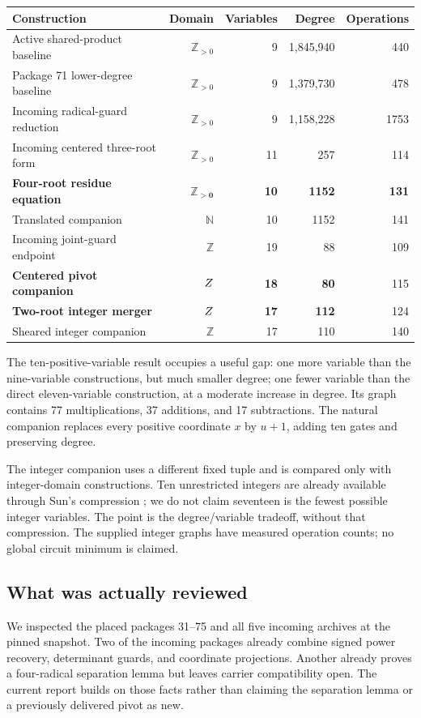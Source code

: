 \documentclass[11pt]{article}
\theoremstyle{remark}
\newcommand{\Z}{\mathbb Z}
\newcommand{\N}{\mathbb N}
\newcommand{\Zp}{\mathbb Z_{>0}}
\begin{document}
\begin{center}
\small
\begin{tabular}{@{}lrrrr@{}}
\toprule
Construction & Domain & Variables & Degree & Operations\\
\midrule
Active shared-product baseline & $\Zp$ & 9 & 1,845,940 & 440\\
Package 71 lower-degree baseline & $\Zp$ & 9 & 1,379,730 & 478\\
Incoming radical-guard reduction & $\Zp$ & 9 & 1,158,228 & 1753\\
Incoming centered three-root form & $\Zp$ & 11 & 257 & 114\\
\textbf{Four-root residue equation} & $\mathbf{\Zp}$ & \textbf{10} & \textbf{1152} & \textbf{131}\\
Translated companion & $\N$ & 10 & 1152 & 141\\
\midrule
Incoming joint-guard endpoint & $\Z$ & 19 & 88 & 109\\
\textbf{Centered pivot companion} & $\mathbf\Z$ & \textbf{18} & \textbf{80} & 115\\
\textbf{Two-root integer merger} & $\mathbf\Z$ & \textbf{17} & \textbf{112} & 124\\
Sheared integer companion & $\Z$ & 17 & 110 & 140\\
\bottomrule
\end{tabular}
\end{center}
The ten-positive-variable result occupies a useful gap: one more variable
than the nine-variable constructions, but much smaller degree; one fewer
variable than the direct eleven-variable construction, at a moderate
increase in degree. Its graph contains 77 multiplications, 37 additions,
and 17 subtractions. The natural companion replaces every positive
coordinate $x$ by $u+1$, adding ten gates and preserving degree.

The integer companion uses a different fixed tuple and is compared only
with integer-domain constructions. Ten unrestricted integers are already
available through Sun's compression \cite{sun,structural}; we do not claim
seventeen is the fewest possible integer variables. The point is the
degree/variable tradeoff, without that compression. The supplied integer graphs have measured operation counts; no global circuit minimum is claimed.

\subsection{What was actually reviewed}
We inspected the placed packages 31--75 and all five incoming archives at
the pinned snapshot. Two of the incoming packages already combine signed
power recovery, determinant guards, and coordinate projections. Another
already proves a four-radical separation lemma but leaves carrier
compatibility open. The current report builds on those facts rather than
claiming the separation lemma or a previously delivered pivot as new.
\end{document}
